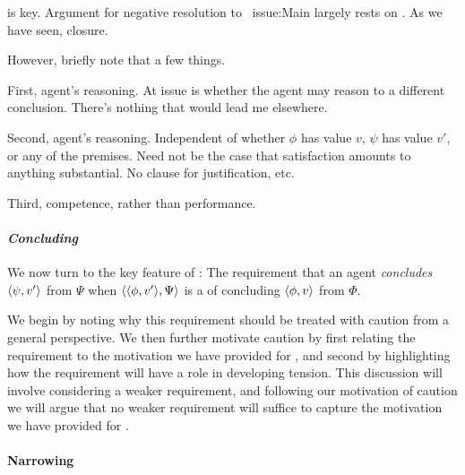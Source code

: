 \begin{note}
  \izetaS{} is key.
  Argument for negative resolution to~{\color{red} issue:Main} largely rests on \izetaS{}.
  As we have seen, closure.

  However, briefly note that a few things.

  First, agent's reasoning.
  At issue is whether the agent may reason to a different conclusion.
  There's nothing that would lead me elsewhere.

  Second, agent's reasoning.
  Independent of whether \(\phi\) has value \(v\), \(\psi\) has value \(v'\), or any of the premises.
  Need not be the case that satisfaction amounts to anything substantial.
  No clause for justification, etc.

  Third, competence, rather than performance.
\end{note}

\paragraph*{\emph{Concluding}}

\begin{note}
  We now turn to the key feature of \izetaS{}:
  The requirement that an agent \emph{concludes} \(\langle \psi, v' \rangle\) from \(\Psi\) when \(\langle \langle \phi, v' \rangle, \Psi \rangle\) is a \requ{} of concluding \(\langle \phi, v \rangle\) from \(\Phi\).

  We begin by noting why this requirement should be treated with caution from a general perspective.
  We then further motivate caution by first relating the requirement to the motivation we have provided for \csN{}, and second by highlighting how the requirement will have a role in developing tension.
  This discussion will involve considering a weaker requirement, and following our motivation of caution we will argue that no weaker requirement will suffice to capture the motivation we have provided for \csN{}.
\end{note}

\paragraph*{Narrowing }

